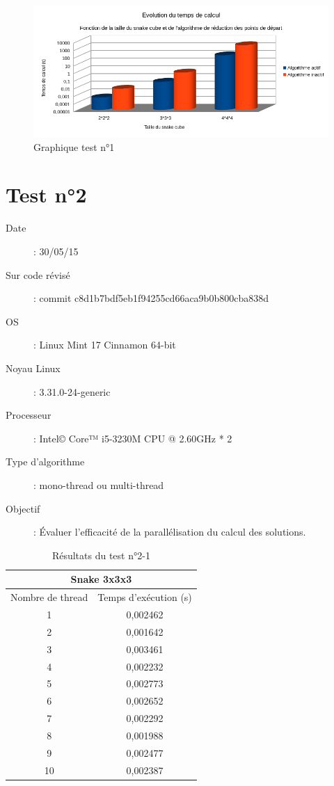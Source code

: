 \begin{figure}[h]
 \centering
 \includegraphics[scale=0.6,keepaspectratio=true]{img/test1.png}
 \caption{Graphique test n°1}
\end{figure}

\newpage

\section{Test n°2}

\begin{description}
 \item[Date]: 30/05/15
 \item[Sur code révisé]: commit c8d1b7bdf5eb1f94255cd66aca9b0b800cba838d
 \item[OS]: Linux Mint 17 Cinnamon 64-bit
 \item[Noyau Linux]: 3.31.0-24-generic
 \item[Processeur]: Intel© Core™ i5-3230M CPU @ 2.60GHz * 2
 \item[Type d'algorithme]: mono-thread ou multi-thread
 \item[Objectif]: Évaluer l'efficacité de la parallélisation du calcul des solutions.
\end{description}

\begin{table}[h]
\begin{center}
\begin{tabular}{|*{2}{c|}}
\hline
\multicolumn{2}{|c|}{Snake 3x3x3} \\
\hline
Nombre de thread & Temps d’exécution (s) \\
\hline
1 & 0,002462 \\
\hline
2 & 0,001642 \\
\hline
3 & 0,003461 \\
\hline
4 & 0,002232 \\
\hline
5 & 0,002773 \\
\hline
6 & 0,002652 \\
\hline
7 & 0,002292 \\
\hline
8 & 0,001988 \\
\hline
9 & 0,002477 \\
\hline
10 & 0,002387 \\
\hline
\end{tabular}
\end{center}
\caption{Résultats du test n°2-1}
\end{table}

